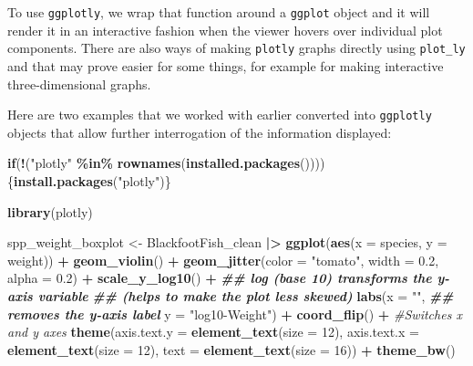 \documentclass[
  10pt,
  letterpaper,
  twoside,
  openright]{book}
\newenvironment{Shaded}{\begin{snugshade}}{\end{snugshade}}
\newcommand{\AttributeTok}[1]{\textcolor[rgb]{0.13,0.29,0.53}{#1}}
\newcommand{\CommentTok}[1]{\textcolor[rgb]{0.56,0.35,0.01}{\textit{#1}}}
\newcommand{\ControlFlowTok}[1]{\textcolor[rgb]{0.13,0.29,0.53}{\textbf{#1}}}
\newcommand{\DecValTok}[1]{\textcolor[rgb]{0.00,0.00,0.81}{#1}}
\newcommand{\DocumentationTok}[1]{\textcolor[rgb]{0.56,0.35,0.01}{\textbf{\textit{#1}}}}
\newcommand{\FloatTok}[1]{\textcolor[rgb]{0.00,0.00,0.81}{#1}}
\newcommand{\FunctionTok}[1]{\textcolor[rgb]{0.13,0.29,0.53}{\textbf{#1}}}
\newcommand{\NormalTok}[1]{#1}
\newcommand{\OtherTok}[1]{\textcolor[rgb]{0.56,0.35,0.01}{#1}}
\newcommand{\SpecialCharTok}[1]{\textcolor[rgb]{0.81,0.36,0.00}{\textbf{#1}}}
\newcommand{\StringTok}[1]{\textcolor[rgb]{0.31,0.60,0.02}{#1}}
\begin{document}
To use \texttt{ggplotly}, we wrap that function around a \texttt{ggplot}
object and it will render it in an interactive fashion when the viewer
hovers over individual plot components. There are also ways of making
\texttt{plotly} graphs directly using \texttt{plot\_ly} and that may
prove easier for some things, for example for making interactive
three-dimensional graphs.

Here are two examples that we worked with earlier converted into
\texttt{ggplotly} objects that allow further interrogation of the
information displayed:

\begin{Shaded}
\begin{Highlighting}[]
\ControlFlowTok{if}\NormalTok{(}\SpecialCharTok{!}\NormalTok{(}\StringTok{"plotly"} \SpecialCharTok{\%in\%} \FunctionTok{rownames}\NormalTok{(}\FunctionTok{installed.packages}\NormalTok{())))\{}\FunctionTok{install.packages}\NormalTok{(}\StringTok{"plotly"}\NormalTok{)\}}

\FunctionTok{library}\NormalTok{(plotly)}

\NormalTok{spp\_weight\_boxplot }\OtherTok{\textless{}{-}}\NormalTok{ BlackfootFish\_clean }\SpecialCharTok{|\textgreater{}}
  \FunctionTok{ggplot}\NormalTok{(}\FunctionTok{aes}\NormalTok{(}\AttributeTok{x =}\NormalTok{ species, }\AttributeTok{y =}\NormalTok{ weight)) }\SpecialCharTok{+}
  \FunctionTok{geom\_violin}\NormalTok{() }\SpecialCharTok{+}
  \FunctionTok{geom\_jitter}\NormalTok{(}\AttributeTok{color =} \StringTok{"tomato"}\NormalTok{, }\AttributeTok{width =} \FloatTok{0.2}\NormalTok{, }\AttributeTok{alpha =} \FloatTok{0.2}\NormalTok{) }\SpecialCharTok{+} 
  \FunctionTok{scale\_y\_log10}\NormalTok{() }\SpecialCharTok{+}
  \DocumentationTok{\#\# log (base 10) transforms the y{-}axis variable}
  \DocumentationTok{\#\# (helps to make the plot less skewed)}
  \FunctionTok{labs}\NormalTok{(}\AttributeTok{x =} \StringTok{""}\NormalTok{, }
       \DocumentationTok{\#\# removes the y{-}axis label}
       \AttributeTok{y =} \StringTok{"log10{-}Weight"}\NormalTok{) }\SpecialCharTok{+}
  \FunctionTok{coord\_flip}\NormalTok{() }\SpecialCharTok{+} \CommentTok{\#Switches x and y axes}
  \FunctionTok{theme}\NormalTok{(}\AttributeTok{axis.text.y =} \FunctionTok{element\_text}\NormalTok{(}\AttributeTok{size =} \DecValTok{12}\NormalTok{), }
        \AttributeTok{axis.text.x =} \FunctionTok{element\_text}\NormalTok{(}\AttributeTok{size =} \DecValTok{12}\NormalTok{), }
        \AttributeTok{text =} \FunctionTok{element\_text}\NormalTok{(}\AttributeTok{size =} \DecValTok{16}\NormalTok{)) }\SpecialCharTok{+}
  \FunctionTok{theme\_bw}\NormalTok{()}


\end{Highlighting}
\end{Shaded}
\end{document}
